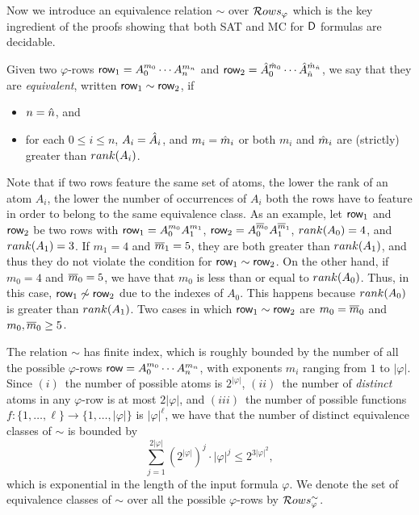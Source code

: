 Now we introduce an equivalence relation $\sim$ over $\mathcal{R} ows_{\varphi}$ which is the key ingredient of the proofs showing that 
both SAT and MC for $\mathsf{D}$ formulas are decidable.
%
\begin{definition}\label{def:equivalence_class}
Given two $\varphi$-rows $\text{{\sffamily row}}_1=A_0^{m_0} \cdots A_n^{m_n}$ and $\text{{\sffamily row}}_2=
\hat{A}_0^{\hat{m}_0} \cdots \hat{A}_{\hat{n}}^{\hat{m}_{\hat{n}}}$, we say that they are \emph{equivalent}, written 
$\text{{\sffamily row}}_1 \sim \text{{\sffamily row}}_2$,
if 
\begin{itemize}
    \item $n=\hat{n}$, and 
    \item for each $0\leq i \leq n$, $A_i =\hat{A}_i$, and ${m_i=\hat{m}_i}$ or
    both $m_i$ and $\hat{m}_i$ are (strictly) greater than $rank(A_i)$.
\end{itemize}
\end{definition}
%
Note that if two rows feature the same set of atoms, the lower the rank of an atom 
$A_i$, the lower the number of occurrences of $A_i$ both the rows have to feature in order to belong to the same equivalence class.
As an example, let $\text{{\sffamily row}}_1$ and $\text{{\sffamily row}}_2$ be two rows with $\text{{\sffamily row}}_1=A_0^{m_0}A_1^{m_1}$,
$\text{{\sffamily row}}_2=A_0^{\overline{m}_0}A_1^{\overline{m}_1}$, $rank(A_0) = 4$, 
and $rank(A_1)= 3$. If $m_1 = 4$ and $\overline{m}_1=5$, they are both greater than $rank(A_1)$, and
thus they do not violate the condition for $\text{{\sffamily row}}_1 \sim \text{{\sffamily row}}_2$. On the other hand,
if $m_0 = 4$ and $\overline{m}_0=5$, we have that $m_0$  is less than or equal to $rank(A_0)$. Thus, in this case, $\text{{\sffamily row}}_1 \not\sim \text{{\sffamily row}}_2$ due to the indexes of $A_0$. This happens because $rank(A_0)$ is greater than $rank(A_1)$. Two cases in which $\text{{\sffamily row}}_1 \sim \text{{\sffamily row}}_2$ 
are $m_0 = \overline{m}_0$ and $m_0, \overline{m}_0 \geq 5$. 

The relation $\sim$ has finite index, which is roughly bounded  by  the number of  all the possible $\varphi$-rows $\text{{\sffamily row}}=A_0^{m_0}\cdots A_n^{m_n}$, with exponents $m_i$ ranging from  $1$ to $ |\varphi|$. Since $(i)$~the number of possible atoms is $2^{|\varphi|}$, $(ii)$~the number of \emph{distinct} atoms in any $\varphi$-row is at most $2|\varphi|$, and $(iii)$~the number of possible functions
$f: \{1,\ldots , \ell\} \rightarrow \{ 1,\ldots ,|\varphi|\}$ is $|\varphi|^{\ell}$, we have that the number of distinct equivalence classes of $\sim$ is bounded by
\[
    \sum_{j=1}^{2|\varphi|} (2^{|\varphi|})^j\cdot |\varphi|^j\leq  2^{3|\varphi|^2},
\]
%
which is exponential in the length of the input formula 
$\varphi$. We denote the set of equivalence classes of $\sim$ over all the possible $\varphi$-rows by $\mathcal{R} ows_{\varphi}^\sim$. 

